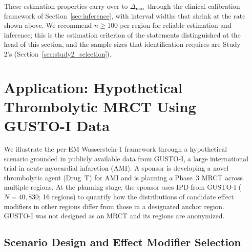 \documentclass[AMA,Times1COL]{WileyNJDv5}
\begin{document}
These estimation properties carry over to $\Delta_{\max}$ through the clinical calibration framework of Section~\ref{sec:inference}, with interval widths that shrink at the rate shown above. We recommend $n \geq 100$ per region for reliable estimation and inference; this is the estimation criterion of the statements distinguished at the head of this section, and the sample sizes that identification requires are Study 2's (Section~\ref{sec:study2_selection}).

\section{Application: Hypothetical Thrombolytic MRCT Using GUSTO-I Data}\label{sec:application}

We illustrate the per-EM Wasserstein-1 framework through a hypothetical scenario grounded in publicly available data from GUSTO-I, a large international trial in acute myocardial infarction (AMI). A sponsor is developing a novel thrombolytic agent (Drug~T) for AMI and is planning a Phase~3 MRCT across multiple regions. At the planning stage, the sponsor uses IPD from GUSTO-I ($N = 40{,}830$; 16 regions)\cite{gusto1993} to quantify how the distributions of candidate effect modifiers in other regions differ from those in a designated anchor region. GUSTO-I was not designed as an MRCT and its regions are anonymized.

\subsection{Scenario Design and Effect Modifier Selection}\label{sec:app_scenario}
\end{document}
